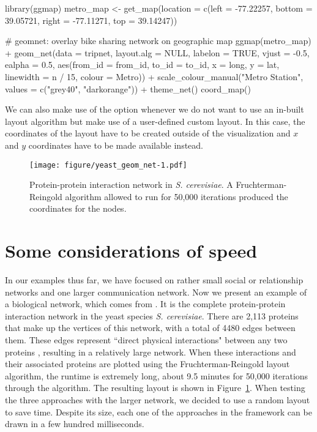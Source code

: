 \begin{example}
  library(ggmap)
metro_map <- get_map(location = c(left = -77.22257, bottom = 39.05721, 
                                  right = -77.11271, top = 39.14247))


\end{example}
  
\begin{example}
# geomnet: overlay bike sharing network on geographic map
  ggmap(metro_map) + 
  geom_net(data = tripnet, layout.alg = NULL, labelon = TRUE,
           vjust = -0.5, ealpha = 0.5,
           aes(from_id = from_id,
               to_id = to_id,
               x = long, y = lat,
               linewidth = n / 15,
               colour = Metro)) +
  scale_colour_manual("Metro Station", values = c("grey40", "darkorange")) +
  theme_net() %
  coord_map() 


\end{example}
  
We can also make use of the option  whenever we do not want to use an in-built layout algorithm but make use of a user-defined custom layout. In this case, the coordinates of the layout have to be created outside of the visualization and $x$ and $y$ coordinates have to be made available instead.





\begin{figure}[bhp]
\centering
\texttt{[image: figure/yeast\_geom\_net-1.pdf]}
\caption{\label{fig.cap:yeast} Protein-protein interaction network in \emph{S. cerevisiae}. A Fruchterman-Reingold algorithm allowed to run for 50,000 iterations produced the coordinates for the nodes.}
\end{figure}


\section{Some considerations of speed}\label{sec:speed}

In our examples thus far, we have focused on rather small social or relationship networks and one larger communication network. Now we present an example of a biological network, which comes from \citet{protein}. It is the complete protein-protein interaction network in the yeast species \emph{S. cerevisiae}. There are 2,113 proteins that make up the vertices of this network, with a total of 4480 edges between them.  These edges represent ``direct physical interactions" between any two proteins \citep[][p. 42]{protein}, resulting in a relatively large  network. When these interactions and their associated proteins are plotted using the Fruchterman-Reingold layout algorithm, the runtime is extremely long, about 9.5 minutes for 50,000 iterations through the algorithm. The resulting layout is shown in Figure~\ref{fig.cap:yeast}. When testing the three approaches with the larger network, we decided to use a random layout to save time. Despite its size, each one of the approaches in the  framework can be drawn in a few hundred milliseconds. 


